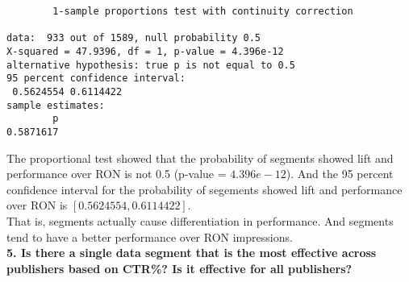 \documentclass[12pt]{article}
\begin{document}
\begin{verbatim}
        1-sample proportions test with continuity correction

data:  933 out of 1589, null probability 0.5 
X-squared = 47.9396, df = 1, p-value = 4.396e-12
alternative hypothesis: true p is not equal to 0.5 
95 percent confidence interval:
 0.5624554 0.6114422 
sample estimates:
        p 
0.5871617 
\end{verbatim}

The proportional test showed that the probability of segments showed lift and performance over RON is not 0.5 (p-value = $4.396e-12$). And the 95 percent confidence interval for the probability of segements showed lift and performance over RON is $[0.5624554, 0.6114422]$. \\

That is, segments actually cause differentiation in performance. And segments tend to have a better performance over RON impressions. \\

{\bf 5.	Is there a single data segment that is the most effective across publishers based on CTR\%? Is it effective for all publishers?}
\end{document}
